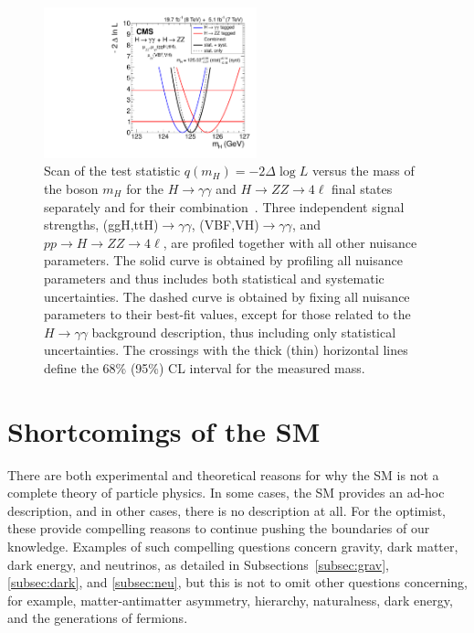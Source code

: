 \begin{figure}[ht]
 \begin{center}
    \includegraphics[width=0.55\textwidth]{figures/intro/sqr_mass_all.pdf}
      \end{center}
\caption{Scan of the test statistic $q(m_H)=−2\Delta\log{L}$ versus the mass of the boson $m_H$ for the $H\rightarrow\gamma\gamma$ and $H\rightarrow ZZ\rightarrow 4\ell$ final states separately and for their combination~\cite{Khachatryan:1979247}. Three independent signal strengths, (ggH,ttH)$\rightarrow\gamma\gamma$, (VBF,VH)$\rightarrow\gamma\gamma$, and $pp\rightarrow H\rightarrow ZZ\rightarrow 4\ell$, are profiled together with all other nuisance parameters. The solid curve is obtained by profiling all nuisance parameters and thus includes both statistical and systematic uncertainties. The dashed curve is obtained by fixing all nuisance parameters to their best-fit values, except for those related to the $H\rightarrow\gamma\gamma$ background description, thus including only statistical uncertainties. The crossings with the thick (thin) horizontal lines define the 68\% (95\%) CL interval for the measured mass. }
\label{fig:measuredmass}
\end{figure}



\section{Shortcomings of the SM\label{sec:SMshortcomings}}

There are both experimental and theoretical reasons for why the SM is not a complete theory of
particle physics. In some cases, the SM provides an ad-hoc description, and in other cases, there
is no description at all. For the optimist, these provide compelling reasons to continue
pushing the boundaries of our knowledge. Examples of such compelling questions concern gravity,
dark matter, dark energy, and neutrinos, as detailed in Subsections~\ref{subsec:grav},
\ref{subsec:dark}, and \ref{subsec:neu}, but this is not to omit other questions concerning,
for example, matter-antimatter asymmetry, hierarchy, naturalness,
dark energy, and the generations of fermions.

